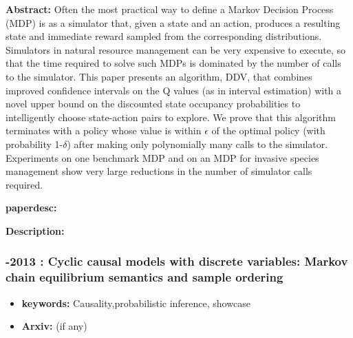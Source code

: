 \documentclass{article}
\begin{document}

\textbf{Abstract:} Often the most practical way to define a Markov Decision Process (MDP) is as a simulator that, given a state and an action, produces a resulting state and immediate reward sampled from the corresponding distributions. Simulators in natural resource management can be very expensive to execute, so that the time required to solve such MDPs is dominated by the number of calls to the simulator. This paper presents an algorithm, DDV, that combines improved confidence intervals on the Q values (as in interval estimation) with a novel upper bound on the discounted state occupancy probabilities to intelligently choose state-action pairs to explore. We prove that this algorithm terminates with a policy whose value is within $\epsilon$ of the optimal policy (with probability 1-$\delta$) after making only polynomially many calls to the simulator. Experiments on one benchmark MDP and on an MDP for invasive species management show very large reductions in the number of simulator calls required.

\textbf{paperdesc:} 

\textbf{Description:} 



\newpage
\subsubsection{\textbf{-2013} : Cyclic causal models with discrete variables: Markov chain equilibrium semantics and sample ordering}
\begin{itemize}
\item \textbf{keywords:} Causality,probabilistic inference, showcase
\item \textbf{Arxiv:}  (if any)
\end{itemize}
\end{document}

